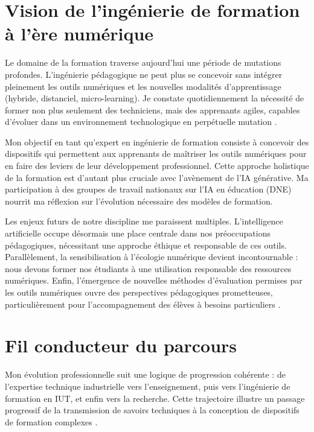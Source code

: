 \section{Vision de l'ingénierie de formation à l'ère numérique}

Le domaine de la formation traverse aujourd'hui une période de mutations profondes. L'ingénierie pédagogique ne peut plus se concevoir sans intégrer pleinement les outils numériques et les nouvelles modalités d'apprentissage (hybride, distanciel, micro-learning). Je constate quotidiennement la nécessité de former non plus seulement des techniciens, mais des apprenants agiles, capables d'évoluer dans un environnement technologique en perpétuelle mutation \parencite{competences_21_siecle}.

Mon objectif en tant qu'expert en ingénierie de formation consiste à concevoir des dispositifs qui permettent aux apprenants de maîtriser les outils numériques pour en faire des leviers de leur développement professionnel. Cette approche holistique de la formation est d'autant plus cruciale avec l'avènement de l'IA générative. Ma participation à des groupes de travail nationaux sur l'IA en éducation (DNE) nourrit ma réflexion sur l'évolution nécessaire des modèles de formation.

Les enjeux futurs de notre discipline me paraissent multiples. L'intelligence artificielle occupe désormais une place centrale dans nos préoccupations pédagogiques, nécessitant une approche éthique et responsable de ces outils. Parallèlement, la sensibilisation à l'écologie numérique devient incontournable : nous devons former nos étudiants à une utilisation responsable des ressources numériques. Enfin, l'émergence de nouvelles méthodes d'évaluation permises par les outils numériques ouvre des perspectives pédagogiques prometteuses, particulièrement pour l'accompagnement des élèves à besoins particuliers \parencite{accessibilite_numerique}.

\section{Fil conducteur du parcours}

Mon évolution professionnelle suit une logique de progression cohérente : de l'expertise technique industrielle vers l'enseignement, puis vers l'ingénierie de formation en IUT, et enfin vers la recherche. Cette trajectoire illustre un passage progressif de la transmission de savoirs techniques à la conception de dispositifs de formation complexes \parencite{recherche_action_education}.

